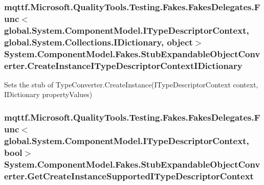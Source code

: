 \hypertarget{class_system_1_1_component_model_1_1_fakes_1_1_stub_expandable_object_converter_aea0095c09f5b843de0278242ff49bdf3}{
\subsubsection[{Create\-Instance\-I\-Type\-Descriptor\-Context\-I\-Dictionary}]{\setlength{\rightskip}{0pt plus 5cm}mqttf.\-Microsoft.\-Quality\-Tools.\-Testing.\-Fakes.\-Fakes\-Delegates.\-Func$<$global.\-System.\-Component\-Model.\-I\-Type\-Descriptor\-Context, global.\-System.\-Collections.\-I\-Dictionary, object$>$ System.\-Component\-Model.\-Fakes.\-Stub\-Expandable\-Object\-Converter.\-Create\-Instance\-I\-Type\-Descriptor\-Context\-I\-Dictionary}}\label{class_system_1_1_component_model_1_1_fakes_1_1_stub_expandable_object_converter_aea0095c09f5b843de0278242ff49bdf3}


Sets the stub of Type\-Converter.\-Create\-Instance(\-I\-Type\-Descriptor\-Context context, I\-Dictionary property\-Values)

\hypertarget{class_system_1_1_component_model_1_1_fakes_1_1_stub_expandable_object_converter_ae942c16b2727284c93b201a57cedb1ea}{
\subsubsection[{Get\-Create\-Instance\-Supported\-I\-Type\-Descriptor\-Context}]{\setlength{\rightskip}{0pt plus 5cm}mqttf.\-Microsoft.\-Quality\-Tools.\-Testing.\-Fakes.\-Fakes\-Delegates.\-Func$<$global.\-System.\-Component\-Model.\-I\-Type\-Descriptor\-Context, bool$>$ System.\-Component\-Model.\-Fakes.\-Stub\-Expandable\-Object\-Converter.\-Get\-Create\-Instance\-Supported\-I\-Type\-Descriptor\-Context}}\label{class_system_1_1_component_model_1_1_fakes_1_1_stub_expandable_object_converter_ae942c16b2727284c93b201a57cedb1ea}


